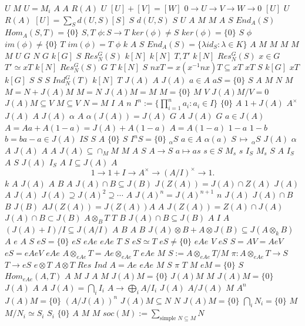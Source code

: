 \documentclass{article}
\begin{document}
$U$
$M$
$U=M_i$
$A$
$A$
$R(A)$
$U$
$[U]+[V]=[W]$
$0 \longrightarrow U \longrightarrow V \longrightarrow W \longrightarrow 0$
$[U]$
$U$
$R(A)$
$[U]=\sum_{S}d(U,S)[S]$
$S$
$d(U,S)$
$S$
$U$
$A$
$M$
$M$
$A$
$S$
$End_A(S)$
$Hom_A(S,T)=\{0\}$
$S,T$
$\phi:S \rightarrow T$
$ker(\phi) \neq S$
$ker(\phi)=\{0\}$
$S$
$\phi$
$im(\phi) \neq \{0\}$
$T$
$im(\phi)=T$
$\phi$
$k$
$A$
$S$
$End_A(S)= \{\lambda id_S:\lambda \in K\}$
$A$
$M$
$M$
$M$
$M$
$M$
$U$
$G$
$N$
$G$
$k[G]$
$S$
$Res_{N}^G(S)$
$k[N]$
$k[N]$
$T,T'$
$k[N]$
$Res_N^G(S)$
$x \in G$
$T' \simeq xT$
$k[N]$
$Res_N^G(S)$
$G$
$T$
$k[N]$
$S$
$nxT=x(x^{-1}nx)T \subseteq xT$
$xT$
$S$
$k[G]$
$xT$
$k[G]$
$S$
$S$
$S$
$Ind_N^G(T)$
$k[N]$
$T$
$J(A)$
$A$
$J(A)$
$a \in A$
$aS=\{0\}$
$S$
$A$
$M$
$N$
$M$
$M=N+J(A)M$
$M=N$
$J(A)M=M$
$M=\{0\}$
$M$
$V$
$J(A)M/V=0$
$J(A)M \subseteq V$
$M \subseteq V$
$N=M$
$I$
$A$
$n$
$I^n:=\{\prod_{i=1}^na_i:a_i \in I\}$
$\{0\}$
$A$
$1+J(A)$
$A^\times$
$J(A)$
$A$
$J(A)$
$\alpha$
$A$
$\alpha(J(A))=J(A)$
$G$
$A$
$J(A)$
$G$
$a \in J(A)$
$A=Aa+A(1-a)=J(A)+A(1-a)$
$A=A(1-a)$
$1-a$
$1-b$
$b=ba-a \in J(A)$
$IS$
$S$
$A$
$\{0\}$
$S$
$I^nS=\{0\}$
$_\alpha S$
$a \in A$
$\alpha(a)$
$S\, \mapsto \,_\alpha S$
$J(A)$
$\alpha$
$A$
$J(A)$
$A$
$A$
$J(A) \subseteq \cap_M M$
$M$
$A$
$S$
$A \rightarrow S$
$a \mapsto as$
$s \in S$
$M_s$
$s$
$I_S$
$M_s$
$S$
$A$
$I_S$
$A$
$S$
$J(A)$
$I_S$
$A$
$I \subseteq J(A)$
$A$
$$
1 \longrightarrow 1+I \longrightarrow A^{\times} \longrightarrow (A/I)^\times \longrightarrow 1.
$$
$k$
$A$
$J(A)$
$A$
$B$
$A$
$J(A) \cap B \subseteq J(B)$
$J(Z(A))=J(A) \cap Z(A)$
$J(A)$
$A$
$J(A)$
$J(A) \supseteq J(A)^2 \supseteq \cdots$
$A$
$J(A)^n=J(A)^{n+1}$
$n$
$J(A)$
$J(A) \cap B$
$B$
$J(B)$
$AJ(Z(A))=J(Z(A))A$
$A$
$J(Z(A)) = Z(A) \cap J(A)$
$J(A) \cap B \subset J(B)$
$A \otimes_B T$
$T$
$B$
$J(A) \cap B \subseteq J(B)$
$A$
$I$
$A$
$(J(A)+I)/I \subseteq J(A/I)$
$A$
$B$
$A$
$B$
$J(A) \otimes B+A \otimes J(B) \subseteq J(A \otimes_k B)$
$A$
$e$
$A$
$S$
$eS=\{0\}$
$eS$
$eAe$
$eAe$
$T$
$S$
$eS \simeq T$
$eS \neq \{0\}$
$eAe$
$V$
$eS$
$S=AV=AeV$
$eS=eAeV$
$eAe$
$A \otimes_{eAe} T=Ae \otimes_{eAe} T$
$eAe$
$M$
$S:=A \otimes_{eAe} T/M$
$\pi:A \otimes_{eAe} T \rightarrow S$
$T \rightarrow eS$
$e \otimes T$
$A \otimes T$
$Res$
$Ind$
$A=Ae$
$eAe$
$M$
$S$
$\pi$
$T$
$M$
$eM=\{0\}$
$S$
$Hom_{eAe}(A,T)$
$A$
$M$
$J$
$A$
$M$
$J(A)M=\{0\}$
$J(A)M$
$M$
$J(A)M=\{0\}$
$J(A)$
$A$
$A$
$J(A)= \bigcap_iI_i$
$A \rightarrow \bigoplus_iA/I_i$
$J(A)$
$A/J(A)$
$M$
$A^n$
$J(A)M=\{0\}$
$(A/J(A))^n$
$J(A)M \subseteq N$
$N$
$J(A)M=\{0\}$
$\bigcap_iN_i=\{0\}$
$M$
$M/N_i\simeq S_i$
$S_i$
$\{0\}$
$A$
$M$
$M$
$soc(M):=\sum_{\text{simple }N \subseteq M}N$
\end{document}
